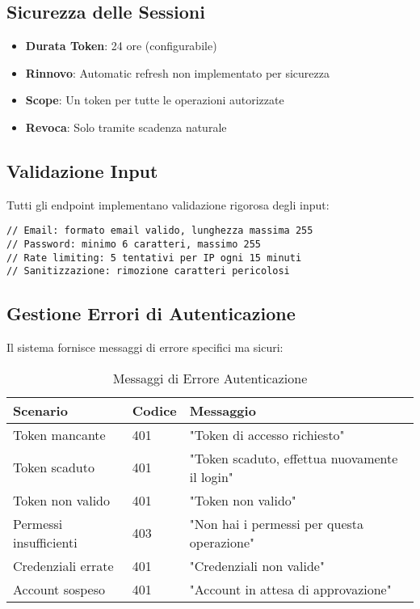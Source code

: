 \subsection{Sicurezza delle Sessioni}
\begin{itemize}
    \item \textbf{Durata Token}: 24 ore (configurabile)
    \item \textbf{Rinnovo}: Automatic refresh non implementato per sicurezza
    \item \textbf{Scope}: Un token per tutte le operazioni autorizzate
    \item \textbf{Revoca}: Solo tramite scadenza naturale
\end{itemize}

\subsection{Validazione Input}
Tutti gli endpoint implementano validazione rigorosa degli input:

\begin{lstlisting}[caption=Esempio Validazioni Login]
// Email: formato email valido, lunghezza massima 255
// Password: minimo 6 caratteri, massimo 255
// Rate limiting: 5 tentativi per IP ogni 15 minuti
// Sanitizzazione: rimozione caratteri pericolosi
\end{lstlisting}

\subsection{Gestione Errori di Autenticazione}
Il sistema fornisce messaggi di errore specifici ma sicuri:

\begin{table}[H]
\centering
\begin{tabular}{@{}lll@{}}
\toprule
\textbf{Scenario} & \textbf{Codice} & \textbf{Messaggio} \\
\midrule
Token mancante & 401 & "Token di accesso richiesto" \\
Token scaduto & 401 & "Token scaduto, effettua nuovamente il login" \\
Token non valido & 401 & "Token non valido" \\
Permessi insufficienti & 403 & "Non hai i permessi per questa operazione" \\
Credenziali errate & 401 & "Credenziali non valide" \\
Account sospeso & 401 & "Account in attesa di approvazione" \\
\bottomrule
\end{tabular}
\caption{Messaggi di Errore Autenticazione}
\end{table}